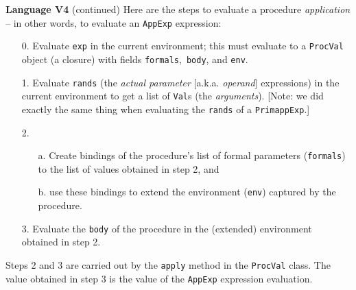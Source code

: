 \begin{minipage}[t]{\sw}
\slidenumber
\LARGE
{\bf Language V4} (continued)\exx
\Large
\emm{}\exx
\LARGE
Here are the steps to evaluate a procedure {\em application} --
in other words, to evaluate an \verb'AppExp' expression:
\begin{enumerate}
\item[0.]
    Evaluate \verb'exp' in the current environment;
    this must evaluate to a \verb'ProcVal' object (a closure)
    with fields \verb'formals',\ \verb'body', and \verb'env'.
\item[1.]
    Evaluate \verb'rands'
    (the {\em actual parameter} [a.k.a. {\em operand}] expressions)
    in the current environment
    to get a list of \verb'Val's (the {\em arguments}).
    [Note: we did exactly the same thing when evaluating the \verb'rands' 
    of a \verb'PrimappExp'.]
\item[2.]
    \begin{enumerate}
    \item[a.]
    Create bindings of the procedure's
    list of formal parameters (\verb'formals')
    to the list of values obtained in step 2, and
    \item[b.]
    use these bindings to extend the environment (\verb'env')
    captured by the procedure.
    \end{enumerate}
\item[3.]
    Evaluate the \verb'body' of the procedure
    in the (extended) environment obtained in step 2.
\end{enumerate}
Steps 2 and 3 are carried out by the \verb'apply' method
in the \verb'ProcVal' class.
The value obtained in step 3 is the value
of the \verb'AppExp' expression evaluation.
\end{minipage}
\clearpage
